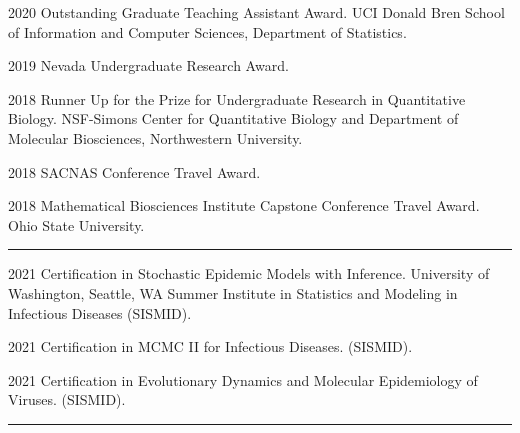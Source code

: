 \documentclass{article}
\begin{document}


\begin{description}
	\vspace{-2mm}
	\item[Awards]\hspace*{.1in}
	
		2020 Outstanding Graduate Teaching Assistant Award. UCI Donald Bren School of Information and Computer Sciences, Department of Statistics.
		\vspace*{1mm}
		
		2019 Nevada Undergraduate Research Award.
		\vspace*{1mm}
		
		2018 Runner Up for the Prize for Undergraduate Research in Quantitative Biology. NSF-Simons Center for Quantitative Biology and Department of Molecular Biosciences, Northwestern University.
		\vspace*{1mm}
		
		2018 SACNAS Conference Travel Award.
		\vspace*{1mm}
		
		2018 Mathematical Biosciences Institute Capstone Conference Travel Award. Ohio State University.
	
\end{description}
\vspace{-2mm}
\rule{\linewidth}{1pt}




\begin{description}
	\vspace{-2mm}
	\item[Certifications]\hspace*{.01in}
	
		2021 Certification in Stochastic Epidemic Models with Inference. University of Washington, Seattle, WA Summer Institute in Statistics and Modeling in Infectious Diseases (SISMID).
		\vspace*{1mm}
		
		2021 Certification in MCMC II for Infectious Diseases. (SISMID).
		\vspace*{1mm}
		
		2021 Certification in Evolutionary Dynamics and Molecular Epidemiology of Viruses. (SISMID).
	
\end{description}
\vspace{-2mm}
\rule{\linewidth}{1pt}
\end{document}
